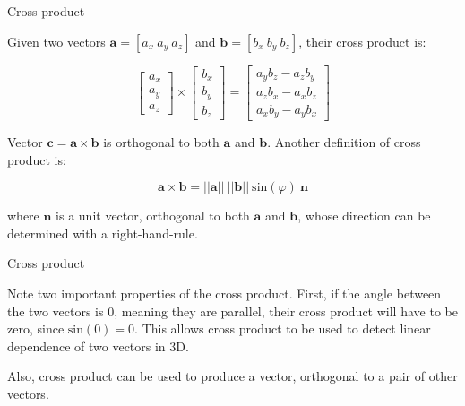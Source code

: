 \documentclass{beamer}
\begin{document}
\begin{frame}{Cross product}
	\begin{flushleft}
		
		Given two vectors $\mathbf a = [a_x \ a_y \ a_z]$ and $\mathbf b = [b_x \ b_y \ b_z]$, their cross product is:
		
		\begin{equation}
			\begin{bmatrix}
				a_x \\ a_y \\ a_z
			\end{bmatrix}
			\times
			\begin{bmatrix}
				b_x \\ b_y \\ b_z
			\end{bmatrix}
			=
			\begin{bmatrix}
				a_y b_z - a_z b_y \\ 
				a_z b_x - a_x b_z \\ 
				a_x b_y - a_y b_x
			\end{bmatrix}
		\end{equation}	
		
		Vector $\mathbf c = \mathbf a \times \mathbf b$ is orthogonal to both $\mathbf a$ and $\mathbf b$. Another definition of cross product is:
		
		\begin{equation}
			\mathbf a \times \mathbf b = ||\mathbf a|| \ ||\mathbf b|| \ \text{sin} (\varphi) \ \mathbf n 
		\end{equation} 
		
		where $\mathbf n $ is a unit vector, orthogonal to  both $\mathbf a$ and $\mathbf b$, whose direction can be determined with a right-hand-rule.
		
		
	\end{flushleft}
\end{frame}



\begin{frame}{Cross product}
	\begin{flushleft}
		
		Note two important properties of the cross product. First, if the angle between the two vectors is 0, meaning they are parallel, their cross product will have to be zero, since $\text{sin}(0) = 0$. This allows cross product to be used to detect linear dependence of two vectors in 3D.
		
		\bigskip
		
		Also, cross product can be used to produce a vector, orthogonal to a pair of other vectors.
		
	\end{flushleft}
\end{frame}
\end{document}
